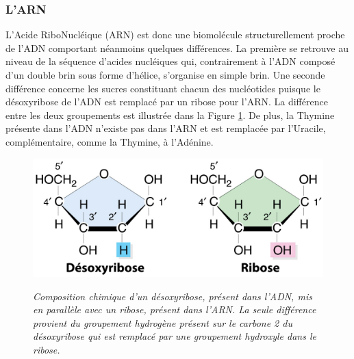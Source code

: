 \subsubsection{L'ARN}

L'Acide RiboNucléique (ARN) est donc une biomolécule structurellement proche de l'ADN comportant néanmoins quelques différences. La première se retrouve au niveau de la séquence d'acides nucléiques qui, contrairement à l'ADN composé d'un double brin sous forme d'hélice, s'organise en simple brin. Une seconde différence concerne les sucres constituant chacun des nucléotides puisque le désoxyribose de l'ADN est remplacé par un ribose pour l'ARN. La différence entre les deux groupements est illustrée dans la Figure \ref{Fig:desoxyribose_vs_ribose}. De plus, la Thymine présente dans l'ADN n'existe pas dans l'ARN et est remplacée par l'Uracile, complémentaire, comme la Thymine, à l'Adénine.

\begin{figure}
  \centering
  {\includegraphics[width=0.8\linewidth]{./figures/ch1/desoxyribose_vs_ribose}}
    \caption{\it Composition chimique d'un désoxyribose, présent dans l'ADN, mis en parallèle avec un ribose, présent dans l'ARN. La seule différence provient du groupement hydrogène présent sur le carbone 2 du désoxyribose qui est remplacé par une groupement hydroxyle dans le ribose.}
    \label{Fig:desoxyribose_vs_ribose}
  \hspace{0.2cm}
\end{figure}


